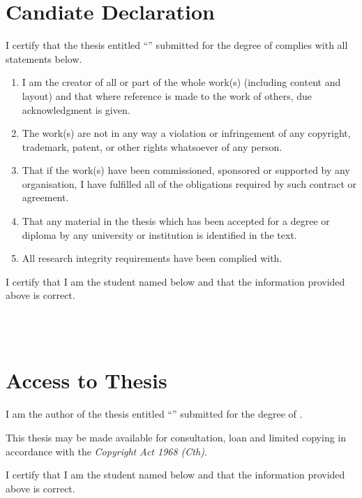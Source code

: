 \newpage
\chapter*{Candiate Declaration}

I certify that the thesis entitled ``\textit{\thetitle{}}'' submitted for the degree of \thedegree{} complies with all statements below.\bigskip
\begin{enumerate}[label=(\roman*)]
  \item I am the creator of all or part of the whole work(s) (including content and layout) and that where reference is made to the work of others, due acknowledgment is given.    
  \item The work(s) are not in any way a violation or infringement of any copyright, trademark, patent, or other rights whatsoever of any person.
  \item That if the work(s) have been commissioned, sponsored or supported by any organisation, I have fulfilled all of the obligations required by such contract or agreement.
  \item That any material in the thesis which has been accepted for a degree or diploma by any university or institution is identified in the text.
  \item All research integrity requirements have been complied with.
\end{enumerate}\bigskip
I certify that I am the student named below and that the information provided above is correct.

\vspace{2cm}

\noindent
\hspace{\fill}
\parbox[b]{0.4\linewidth}{
  \hrulefill\\
  \raggedleft
  \theauthor{}\\
  \footnotesize
  \thedate{}
}

\newpage
\chapter*{Access to Thesis}

I am the author of the thesis entitled ``\textit{\thetitle{}}'' submitted for the degree of \thedegree{}.

\bigskip
\noindent
This thesis may be made available for consultation, loan and limited copying in accordance with the \textit{Copyright Act 1968 (Cth)}.

\bigskip
\noindent
I certify that I am the student named below and that the information provided above is correct.

\vspace{2cm}

\noindent
\hspace{\fill}
\parbox[b]{0.4\linewidth}{
  \hrulefill\\
  \raggedleft
  \theauthor{}\\
  \footnotesize
  \thedate{}
}